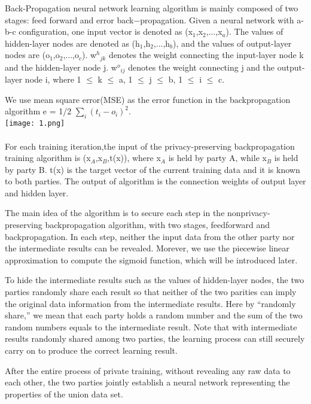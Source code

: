 \documentclass[twoside,twocolumn]{article}
\begin{document}
Back-Propagation neural network learning algorithm is mainly composed of two stages: feed forward and error back−propagation. Given a neural network with a-b-c configuration, one input vector is denoted as (x$_1$,x$_2$,...,x$_a$). The values of hidden-layer nodes are denoted as (h$_1$,h$_2$,...,h$_b$), and the values of output-layer nodes are (o$_1$,o$_2$,...,o$_c$). w$^h$$_{jk}$ denotes the weight connecting the input-layer node k and the hidden-layer node j. w$^o$$_{ij}$ denotes the weight connecting j and the output-layer node i, where 1 $\le$ k $\le$ a, 1 $\le$ j $\le$ b, 1 $\le$ i $\le$ c.

We use mean square error(MSE) as the error function in the backpropagation algorithm e = 1/2 $\sum_{i}(t_i-o_i)^2$.\\

\texttt{[image: 1.png]}\\
~\\

For each training iteration,the input of the privacy-preserving backpropagation training algorithm is ({x$_A$,x$_B$},t(x)), where x$_A$ is held by party A, while x$_B$ is held by party B. t(x) is the target vector of the current training data and it is known to both parties. The output of algorithm is the connection weights of output layer and hidden layer.

The main idea of the algorithm is to secure each step in the nonprivacy-preserving backpropagation algorithm, with two stages, feedforward and backpropagation. In each step, neither the input data from the other party nor the intermediate results can be revealed. Morever, we use the piecewise linear approximation to compute the sigmoid function, which will be introduced later.

To hide the intermediate results such as the values of hidden-layer nodes, the two parties randomly share each result so that neither of the two parities can imply the original data
information from the intermediate results. Here by “randomly share,” we mean that each party holds a random number and the sum of the two random numbers equals to the intermediate
result. Note that with intermediate results randomly shared among two parties, the learning process can still securely carry on to produce the correct learning result.

After the entire process of private training, without revealing any raw data to each other, the two parties jointly establish a neural network representing the properties of the union data set.
~\\
~\\
~\\
\end{document}

